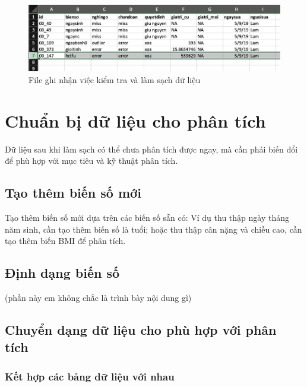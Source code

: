 \documentclass[]{tufte-book}
\begin{document}
\begin{figure}

{\centering \includegraphics[width=0.8\linewidth]{figures/02_04} 

}

\caption[File ghi nhận việc kiểm tra và làm sạch dữ liệu]{File ghi nhận việc kiểm tra và làm sạch dữ liệu}\label{fig:documentclean}
\end{figure}

\hypertarget{chun-bi-d-liu-cho-phan-tich}{%
\chapter{Chuẩn bị dữ liệu cho phân tích}\label{chun-bi-d-liu-cho-phan-tich}}

Dữ liệu sau khi làm sạch có thể chưa phân tích được ngay, mà cần phải biến đổi để phù hợp với mục tiêu và kỹ thuật phân tích.

\hypertarget{tao-them-bin-s-mi}{%
\section{Tạo thêm biến số mới}\label{tao-them-bin-s-mi}}

Tạo thêm biến số mới dựa trên các biến số sẵn có: Ví dụ thu thập ngày tháng năm sinh, cần tạo thêm biến số là tuổi; hoặc thu thập cân nặng và chiều cao, cần tạo thêm biến BMI để phân tích.

\hypertarget{inh-dang-bin-s}{%
\section{Định dạng biến số}\label{inh-dang-bin-s}}

(phần này em không chắc là trình bày nội dung gì)

\hypertarget{chuyn-dang-d-liu-cho-phu-hp-vi-phan-tich}{%
\section{Chuyển dạng dữ liệu cho phù hợp với phân tích}\label{chuyn-dang-d-liu-cho-phu-hp-vi-phan-tich}}

\hypertarget{kt-hp-cac-bang-d-liu-vi-nhau}{%
\subsection{Kết hợp các bảng dữ liệu với nhau}\label{kt-hp-cac-bang-d-liu-vi-nhau}}
\end{document}
